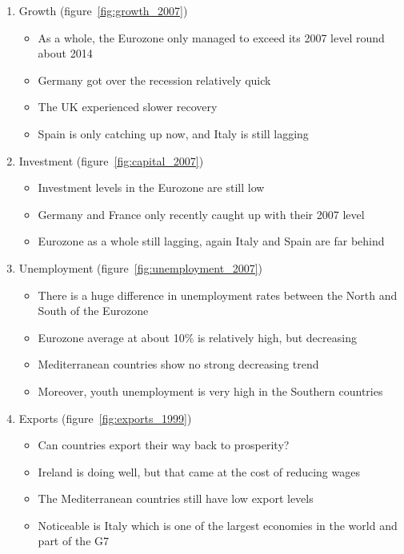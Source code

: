 \documentclass{tufte-handout}
\begin{document}
\begin{enumerate}
  \item Growth (figure~\ref{fig:growth_2007})
  \begin{itemize}
    \item As a whole, the Eurozone only managed to exceed its 2007 level round about 2014
    \item Germany got over the recession relatively quick
    \item The UK experienced slower recovery
    \item Spain is only catching up now, and Italy is still lagging
  \end{itemize}

  \item Investment (figure~\ref{fig:capital_2007})
  \begin{itemize}
    \item Investment levels in the Eurozone are still low
    \item Germany and France only recently caught up with their 2007 level
    \item Eurozone as a whole still lagging, again Italy and Spain are far behind
  \end{itemize}


  \item Unemployment (figure~\ref{fig:unemployment_2007})
  \begin{itemize}
    \item There is a huge difference in unemployment rates between the North and South of the Eurozone
    \item Eurozone average at about 10\% is relatively high, but decreasing
    \item Mediterranean countries show no strong decreasing trend
    \item Moreover, youth unemployment is very high in the Southern countries
  \end{itemize}

  \item Exports (figure~\ref{fig:exports_1999})
  \begin{itemize}
    \item Can countries export their way back to prosperity?
    \item Ireland is doing well, but that came at the cost of reducing wages
    \item The Mediterranean countries still have low export levels
    \item Noticeable is Italy which is one of the largest economies in the world and part of the G7
  \end{itemize}
\end{enumerate}
\end{document}
